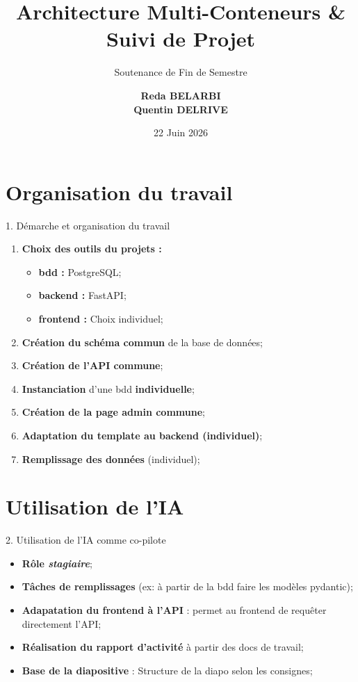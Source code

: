 \documentclass[10pt, aspectratio=169]{beamer}
\title[\textbf{Portfolio S3}]{\textbf{Architecture Multi-Conteneurs \& Suivi de Projet}}
\subtitle{Soutenance de Fin de Semestre}
\author{\textbf{Reda BELARBI \\ Quentin DELRIVE}}
\institute[IUT]{IUT - Département Science des Données}
\date{22 Juin 2026}
\begin{document}
\begin{frame}
  \titlepage
\end{frame}

\section{Organisation du travail}
\begin{frame}{\large 1. Démarche et organisation du travail}
  \begin{enumerate}
      \item \textbf{Choix des outils du projets :}
      \pause
      \begin{itemize}
          \item \textbf{bdd :} PostgreSQL;
          \item \textbf{backend :} FastAPI;
          \item \textbf{frontend :} Choix individuel;
      \end{itemize}
      \pause
      \item \textbf{Création du schéma commun} de la base de données;
      \pause
      \item \textbf{Création de l'API commune};
      \pause
      \item \textbf{Instanciation} d'une bdd \textbf{individuelle};
      \pause
      \item \textbf{Création de la page admin commune};
      \pause
      \item \textbf{Adaptation du template au backend (individuel)};
      \pause
      \item \textbf{Remplissage des données} (individuel);
  \end{enumerate}
\end{frame}

\section{Utilisation de l'IA}
\begin{frame}{\large 2. Utilisation de l'IA comme co-pilote}
  \begin{itemize}
      \item \textbf{Rôle \textit{stagiaire}};
      \item \textbf{Tâches de remplissages} (ex: à partir de la bdd faire les modèles pydantic);
      \item \textbf{Adapatation du frontend à l'API} : permet au frontend de requêter directement l'API;
      \item \textbf{Réalisation du rapport d'activité} à partir des docs de travail;
      \item \textbf{Base de la diapositive} : Structure de la diapo selon les consignes;
  \end{itemize}
\end{frame}
\end{document}
